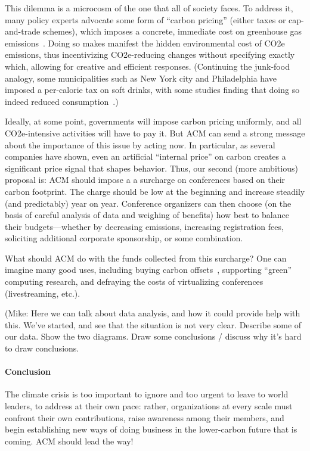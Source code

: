 \documentclass[12pt]{article}
\newcommand{\bcp}[1]{\ifdraft{\bf [bcp: #1]}\fi}
\newcommand{\SECTION}{\paragraph*}
\begin{document}
This dilemma is a microcosm of the one that all of society faces. To address
it, many policy experts advocate some form of ``carbon pricing'' (either
taxes or cap-and-trade schemes), which imposes a concrete, immediate cost on
greenhouse gas emissions~\cite{carbonprice}. Doing so makes manifest the
hidden environmental cost of CO2e emissions, thus incentivizing
CO2e-reducing changes without specifying exactly which, allowing for
creative and efficient responses. (Continuing the junk-food analogy, some
municipalities such as New York city and Philadelphia have imposed a
per-calorie tax on soft drinks, with some studies finding that doing so
indeed reduced consumption~\cite{sodatax}.)

Ideally, at some point, governments will impose carbon pricing uniformly,
and all CO2e-intensive activities will have to pay it. But ACM can send a
strong message about the importance of this issue by acting now. In
particular, as several companies have shown, even an artificial ``internal
price'' on carbon creates a significant price signal that shapes behavior.
%
Thus, our second (more ambitious) proposal is: ACM should impose a a
surcharge on conferences based on their carbon footprint.  The charge should
be low at the beginning and increase steadily (and predictably) year on
year.
%
Conference organizers can then choose (on the basis of careful analysis of
data and weighing of benefits) how best to balance their budgets---whether
by decreasing emissions, increasing registration fees, soliciting additional
corporate sponsorship, or some combination.

What should ACM do with the funds collected from this surcharge?  One can
imagine many good uses, including buying carbon
offsets~\cite{CarbonOFfsetReport}, supporting ``green'' computing
research\bcp{can we mention some specifics?}, and defraying the costs of
virtualizing conferences (livestreaming, etc.).

(Mike: Here we can talk about data analysis, and how it could provide
help with this. We've started, and see that the situation is not very
clear. Describe some of our data.  Show the two diagrams.  Draw some
conclusions / discuss why it's hard to draw conclusions.

\SECTION{Conclusion}

The climate crisis is too important to ignore and too urgent to leave to
world leaders, to address at their own pace: rather, organizations at every
scale must confront their own contributions, raise awareness among their
members, and begin establishing new ways of doing business in the
lower-carbon future that is coming.  ACM should lead the way!
\end{document}
